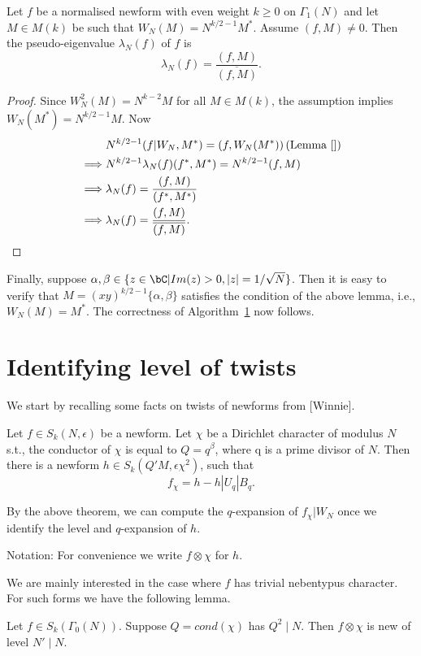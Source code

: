 \documentclass [11pt, proquest] {uwthesis}[2015/03/03]
\begin{document}
\begin{Lemma}
Let $f$ be a normalised newform with even weight $k \geq 0$ on $\Gamma_1(N)$ and let $M \in M(k)$ be such that $W_N(M) = N^{k/2 -1} M^*$. Assume $(f, M) \neq 0$.  Then the pseudo-eigenvalue $\lambda_N(f)$ of $f$ is 
\[
	\lambda_N(f) = \frac{(f,M)}{\overline{(f,M)}}.
\]
\end{Lemma} 

\begin{proof}
Since $W_N^2(M) = N^{k-2}M$ for all $M \in M(k)$, the assumption implies $W_N(M^*) = N^{k/2 -1} M$. 
Now 
\begin{align*}
& N^{k/2-1}(f|W_N, M^*) = (f,W_N(M^*)) \, (\mbox{Lemma~\ref{}})\\ 
\implies & N^{k/2-1}\lambda_N(f)(f^*,M^*) = N^{k/2-1}(f, M) \\
\implies & \lambda_N(f) = \frac{(f,M)}{(f^*,M^*)} \\ 
\implies &	\lambda_N(f) = \frac{(f,M)}{\overline{(f,M)}}.
\end{align*}
\end{proof}

Finally, suppose $\alpha, \beta \in \{z \in \bC | Im(z) > 0,  |z| = 1/\sqrt{N}\}$. Then it is easy to verify that $M = (xy)^{k/2-1}\{\alpha, \beta\}$ satisfies the condition of the above lemma, i.e., $W_N(M) = M^*$. The correctness of Algorithm~\ref{} now follows. 



\section{Identifying level of twists}

We start by recalling some facts on twists of newforms from [Winnie]. 
\begin{theorem}
Let $f \in S_k(N, \epsilon)$ be a newform. Let $\chi$ be a Dirichlet character of modulus $N$ s.t., the conductor of $\chi$ is equal to $Q = q^\beta$, where q is a 
prime divisor of $N$. Then there is a newform $h \in S_k(Q'M, \epsilon \chi^2)$, such that
$$f_\chi = h -  h|U_q|B_q. $$
\end{theorem}

By the above theorem, we can compute the $q$-expansion of $f_\chi | W_N$ once we identify the level and $q$-expansion of $h$. 

Notation: For convenience we write $f \otimes \chi$ for $h$.

We are mainly interested in the case where $f$ has trivial nebentypus character. For such forms 
we have the following lemma.
\begin{Lemma}
Let $f \in S_k(\Gamma_0(N))$. Suppose $Q = cond(\chi)$ has $Q^2 \mid N$. Then $f \otimes \chi$ is new of level $N' \mid N$. 
\end{Lemma}
\end{document}
